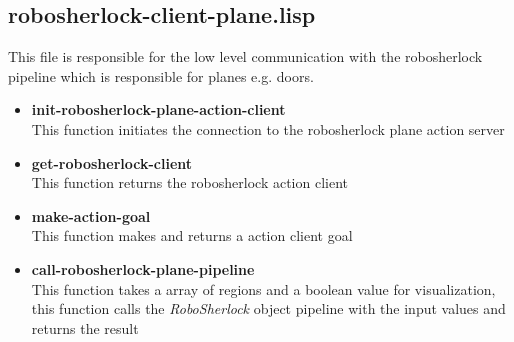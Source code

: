 \documentclass[main.tex]{subfiles}
\begin{document}
		\subsection{robosherlock-client-plane.lisp}
		This file is responsible for the low level communication with the robosherlock pipeline which is responsible for planes e.g. doors.
		\begin{itemize}
			\item \textbf{init-robosherlock-plane-action-client} \\
			This function initiates the connection to the robosherlock plane action server
			\item \textbf{get-robosherlock-client} \\
			This function returns the robosherlock action client
			\item \textbf{make-action-goal} \\
			This function makes and returns a action client goal
			\item \textbf{call-robosherlock-plane-pipeline} \\
			This function takes a array of regions and a boolean value for visualization, this function calls the \textit{RoboSherlock} object pipeline with the input values and returns the result
		\end{itemize}
	\endgroup
\end{document}
